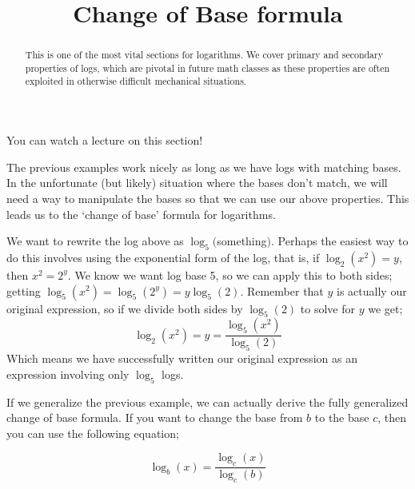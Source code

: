 \documentclass{ximeraXloud}
\title{Change of Base formula}
\begin{document}
\begin{abstract}
    This is one of the most vital sections for logarithms. We cover primary and secondary properties of logs, which are pivotal in future math classes as these properties are often exploited in otherwise difficult mechanical situations.
\end{abstract}
\maketitle

You can watch a lecture on this section!


The previous examples work nicely as long as we have logs with matching bases. In the unfortunate (but likely) situation where the bases don't match, we will need a way to manipulate the bases so that we can use our above properties. This leads us to the `change of base' formula for logarithms.

\begin{explanation}%
    We want to rewrite the log above as $\log_5($something$)$. Perhaps the easiest way to do this involves using the exponential form of the log, that is, if $\log_2(x^2) = y$, then $x^2 = 2^y$. We know we want log base 5, so we can apply this to both sides; getting $\log_5(x^2) = \log_5(2^y) = y\log_5(2)$. Remember that $y$ is actually our original expression, so if we divide both sides by $\log_5(2)$ to solve for $y$ we get;
    \[
        \log_2(x^2) = y = \frac{\log_5 \left(x^2\right)}{\log_5(2)}
    \]
    Which means we have successfully written our original expression as an expression involving only $\log_5$ logs.
\end{explanation}%

If we generalize the previous example, we can actually derive the fully generalized change of base formula. If you want to change the base from $b$ to the base $c$, then you can use the following equation;

\[
    \log_b(x) = \frac{\log_c(x)}{\log_c(b)}
\]

%    
%
%
%
%
%
\end{document}
